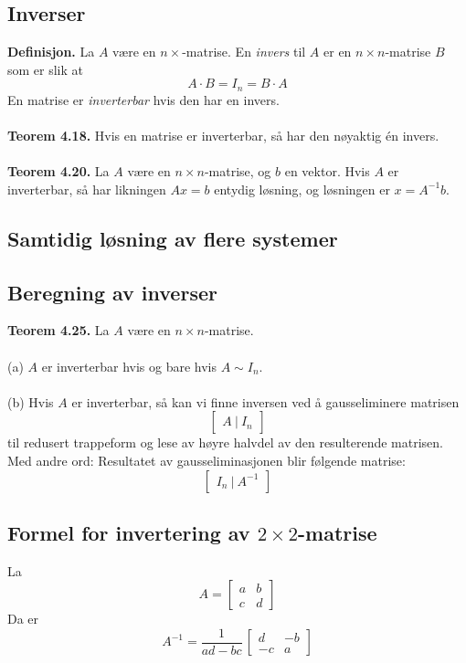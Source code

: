 \documentclass{article}
\begin{document}
\subsection{Inverser}
\textbf{Definisjon.} La $A$ være en $n \times $-matrise. En \textit{invers} til $A$ er en $n \times n$-matrise $B$ som er slik at
\[ A \cdot B = I_n = B \cdot A \]
En matrise er \textit{inverterbar} hvis den har en invers.
\\\\
\textbf{Teorem 4.18.} Hvis en matrise er inverterbar, så har den nøyaktig én invers.
\\\\
\textbf{Teorem 4.20.} La $A$ være en $n \times n$-matrise, og $b$ en vektor. Hvis $A$ er inverterbar, så har likningen $Ax = b$ entydig løsning, og løsningen er $x = A^{-1}b$.


\subsection{Samtidig løsning av flere systemer}


\subsection{Beregning av inverser}
\textbf{Teorem 4.25.} La $A$ være en $n \times n$-matrise.\\\\
(a) $A$ er inverterbar hvis og bare hvis $A \sim I_n$.
\\\\
(b) Hvis $A$ er inverterbar, så kan vi finne inversen ved å gausseliminere matrisen
\[ \begin{bmatrix} A \ | \ I_n \end{bmatrix} \]
til redusert trappeform og lese av høyre halvdel av den resulterende matrisen. Med andre ord: Resultatet av gausseliminasjonen blir følgende matrise: 
\[ \begin{bmatrix} I_n \ | \ A^{-1} \end{bmatrix} \]

\subsection{Formel for invertering av $2 \times 2$-matrise}
La
\[ A = \begin{bmatrix} a & b \\ c & d \end{bmatrix} \]
Da er
\[ A^{-1} = \frac{1}{ad-bc} \, \begin{bmatrix} d & -b \\ -c & a \end{bmatrix} \]
\end{document}
